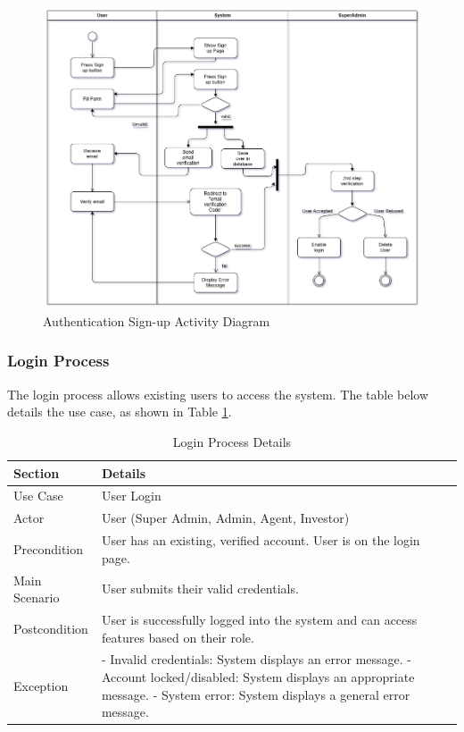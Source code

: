 \begin{figure}[ht!]
    \centering
    \includegraphics[width=1\textwidth]{images/signup_activitydiag.png}
    \caption{Authentication Sign-up Activity Diagram}
    \label{fig:signup-activity-diagram}
\end{figure}



\subsubsection{Login Process}
The login process allows existing users to access the system. The table below details the use case, as shown in Table \ref{tab:login_process}.
\newpage

\begin{table}[htbp]
    \centering
    \begin{tabular}{|l|p{}|}
        \hline
        \textbf{Section} & \textbf{Details} \\
        \hline
        Use Case & User Login \\
        \hline
        Actor & User (Super Admin, Admin, Agent, Investor) \\
        \hline
        Precondition & User has an existing, verified account. User is on the login page. \\
        \hline
        Main Scenario & 
        User submits their valid credentials. \\
        \hline
        Postcondition & User is successfully logged into the system and can access features based on their role. \\
        \hline
        Exception & 
        - Invalid credentials: System displays an error message.
        - Account locked/disabled: System displays an appropriate message.
        - System error: System displays a general error message. \\
        \hline
    \end{tabular}
    \caption{Login Process Details}
    \label{tab:login_process}
\end{table}

